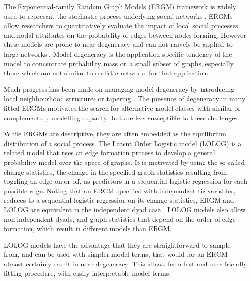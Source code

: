\documentclass[
]{statsoc}
\begin{document}
The Exponential-family Random Graph Models (ERGM) framework is widely
used to represent the stochastic process underlying social networks
\citep{FrankStrauss1986,Hunter2006}. ERGMs allow researchers to
quantitatively evaluate the impact of local social processes and nodal
attributes on the probability of edges between nodes forming. However
these models are prone to near-degeneracy \citep{Handcock2003} and can
not naively be applied to large networks
\citep{schweinberger2011,chatterjee2013}. Model degeneracy is the
application specific tendency of the model to concentrate probability
mass on a small subset of graphs, especially those which are not similar
to realistic networks for that application.

Much progress has been made on managing model degeneracy by introducing
local neighbourhood structures \citep{schweinbergerhandcock2015} or
tapering \citep{fellowshandcock2017}. The presence of degeneracy in many
fitted ERGMs motivates the search for alternative model classes with
similar or complementary modelling capacity that are less susceptible to
these challenges.

While ERGMs are descriptive, they are often embedded as the equilibrium
distribution of a social process. The Latent Order Logistic model
(LOLOG) \citep{Fellows2018} is a related model that uses an edge
formation process to develop a general probability model over the space
of graphs. It is motivated by using the so-called change statistics, the
change in the specified graph statistics resulting from toggling an edge
on or off, as predictors in a sequential logistic regression for each
possible edge. Noting that an ERGM specified with independent tie
variables, reduces to a sequential logistic regression on its change
statistics, ERGM and LOLOG are equivalent in the independent dyad case
\citep{Fellows2018}. LOLOG models also allow non-independent dyads, and
graph statistics that depend on the order of edge formation, which
result in different models than ERGM.

LOLOG models have the advantage that they are straightforward to sample
from, and can be used with simpler model terms, that would for an ERGM
almost certainly result in near-degeneracy. This allows for a fast and
user friendly fitting procedure, with easily interpretable model terms.
\end{document}
